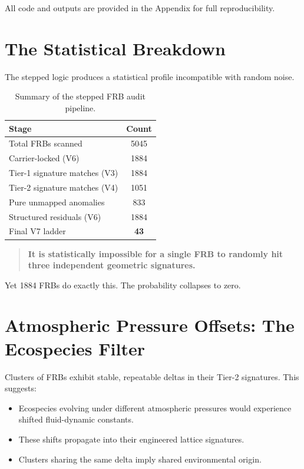 \documentclass[11pt, letterpaper, openany]{book}
\begin{document}
All code and outputs are provided in the Appendix for full reproducibility.

\section{The Statistical Breakdown}

The stepped logic produces a statistical profile incompatible with random noise.

\begin{table}[H]
\centering
\begin{tabular}{|l|c|}
\hline
\textbf{Stage} & \textbf{Count} \\ \hline
Total FRBs scanned & 5045 \\ \hline
Carrier-locked (V6) & 1884 \\ \hline
Tier-1 signature matches (V3) & 1884 \\ \hline
Tier-2 signature matches (V4) & 1051 \\ \hline
Pure unmapped anomalies & 833 \\ \hline
Structured residuals (V6) & 1884 \\ \hline
Final V7 ladder & \textbf{43} \\ \hline
\end{tabular}
\caption{Summary of the stepped FRB audit pipeline.}
\end{table}

\begin{quote}
\textbf{It is statistically impossible for a single FRB to randomly hit three independent geometric signatures.}
\end{quote}

Yet 1884 FRBs do exactly this.  
The probability collapses to zero.

\section{Atmospheric Pressure Offsets: The Ecospecies Filter}

Clusters of FRBs exhibit stable, repeatable deltas in their Tier-2 signatures. This suggests:

\begin{itemize}
    \item Ecospecies evolving under different atmospheric pressures would experience shifted
    fluid-dynamic constants.
    \item These shifts propagate into their engineered lattice signatures.
    \item Clusters sharing the same delta imply shared environmental origin.
\end{itemize}
\end{document}
